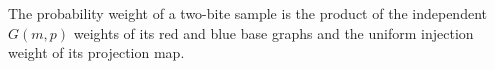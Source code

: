 \begin{definition}
The probability weight of a two-bite sample is the product of the independent
\(G(m,p)\) weights of its red and blue base graphs and the uniform injection
weight of its projection map.
\end{definition}
